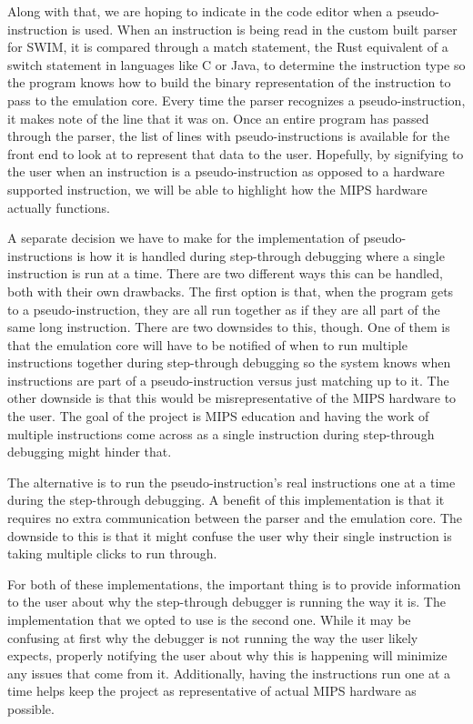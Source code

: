 \documentclass[
    paper=letter,
    parskip=half,
    fontsize=12pt,
    titlepage=firstiscover,
    toc=bibliography,
    numbers=endperiod
]{scrartcl}
\begin{document}
Along with that, we are hoping to indicate in the code editor when a
pseudo-instruction is used. When an instruction is being read in the
custom built parser for SWIM, it is compared through a match statement,
the Rust equivalent of a switch statement in languages like C or Java,
to determine the instruction type so the program knows how to build the
binary representation of the instruction to pass to the emulation core.
Every time the parser recognizes a pseudo-instruction, it makes note of
the line that it was on. Once an entire program has passed through the
parser, the list of lines with pseudo-instructions is available for the
front end to look at to represent that data to the user. Hopefully, by
signifying to the user when an instruction is a pseudo-instruction as
opposed to a hardware supported instruction, we will be able to
highlight how the MIPS hardware actually functions.

A separate decision we have to make for the implementation of
pseudo-instructions is how it is handled during step-through debugging
where a single instruction is run at a time. There are two different
ways this can be handled, both with their own drawbacks. The first option
is that, when the program gets to a pseudo-instruction, they are all run
together as if they are all part of the same long instruction. There are
two downsides to this, though. One of them is that the emulation core
will have to be notified of when to run multiple instructions together
during step-through debugging so the system knows when instructions are
part of a pseudo-instruction versus just matching up to it. The other
downside is that this would be misrepresentative of the MIPS hardware to
the user. The goal of the project is MIPS education and having the work
of multiple instructions come across as a single instruction during
step-through debugging might hinder that.

The alternative is to run the pseudo-instruction's real instructions one
at a time during the step-through debugging. A benefit of this
implementation is that it requires no extra communication between the
parser and the emulation core. The downside to this is that it might
confuse the user why their single instruction is taking multiple clicks
to run through.

For both of these implementations, the important thing is to provide
information to the user about why the step-through debugger is running
the way it is. The implementation that we opted to use is the second
one. While it may be confusing at first why the debugger is not running
the way the user likely expects, properly notifying the user about why
this is happening will minimize any issues that come from it.
Additionally, having the instructions run one at a time helps keep the
project as representative of actual MIPS hardware as possible.
\end{document}
